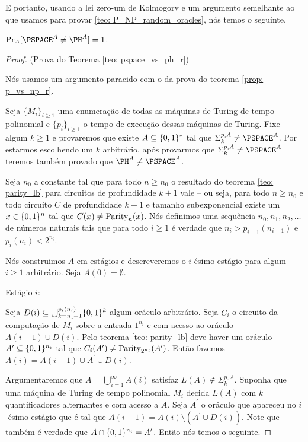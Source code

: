 E portanto, usando a lei zero-um de Kolmogorv e um argumento semelhante ao que usamos para provar \ref{teo: P_NP_random_oracles}, nós temos o seguinte.

\begin{teo} \label{teo: pspace_vs_ph_random}

$\Pr_{A}[\PSPACE^{A} \neq \PH^{A}] = 1$.

\end{teo}

\begin{proof} (Prova do Teorema \ref{teo: pspace_vs_ph_r})

Nós usamos um argumento paracido com o da prova do teorema \ref{prop: p_vs_np_r}.

Seja $\{M_{i}\}_{i \geq 1}$ uma enumeração de todas as máquinas de Turing de tempo polinomial e $\{p_{i}\}_{i \geq 1}$ o tempo de execução dessas máquinas de Turing. Fixe algum $k \geq 1$ e provaremos que existe $A \subseteq \{0, 1\}^{*}$ tal que $\Sigma_{k}^{p, A} \neq \PSPACE^{A}$. Por estarmos escolhendo um $k$ arbitrário, após provarmos que $\Sigma_{k}^{p, A} \neq \PSPACE^{A}$ teremos também provado que $\PH^{A} \neq \PSPACE^{A}$.

Seja $n_{0}$ a constante tal que para todo $n \geq n_{0}$ o resultado do teorema \ref{teo: parity_lb} para circuitos de profundidade $k + 1$ vale -- ou seja, para todo $n \geq n_{0}$ e todo circuito $C$ de profundidade $k + 1$ e tamanho subexponencial existe um $x \in \{0, 1\}^{n}$ tal que $C(x) \neq \text{Parity}_{n}(x)$. Nós definimos uma sequência $n_{0}, n_{1}, n_{2}, \dots$ de números naturais tais que para todo $i \geq 1$ é verdade que $n_{i} > p_{i - 1}(n_{i - 1})$ e $p_{i}(n_{i}) < 2^{n_{i}}$.

Nós construimos $A$ em estágios e descreveremos o $i$-ésimo estágio para algum $i \geq 1$ arbitrário. Seja $A(0) = \emptyset$.

Estágio $i$:

Seja $D(i) \subseteq \bigcup_{k = n_{i} + 1}^{p_{i}(n_{i})} \{0, 1\}^{k}$ algum oráculo arbitrário. Seja $C_{i}$ o circuito da computação de $M_{i}$ sobre a entrada $1^{n_{i}}$ e com acesso ao oráculo $A(i - 1) \cup D(i)$. Pelo teorema \ref{teo: parity_lb} deve haver um oráculo $A^{\prime} \subseteq \{0, 1\}^{n_{i}}$ tal que $C_{i}(A^{\prime}) \neq \text{Parity}_{2^{n_{i}}}(A^{\prime})$. Então fazemos $A(i) = A(i - 1) \cup A^{\prime} \cup D(i)$.

Argumentaremos que $A = \bigcup_{i = 1}^{\infty}A(i)$ satisfaz $L(A) \not\in \Sigma_{k}^{p, A}$. Suponha que uma máquina de Turing de tempo polinomial $M_{i}$ decida $L(A)$ com $k$ quantificadores alternantes e com acesso a $A$. Seja $A^{\prime}$ o oráculo que apareceu no $i$-ésimo estágio que é tal que $A(i - 1) = A(i) \setminus (A^{\prime} \cup D(i))$. Note que também é verdade que $A \cap \{0, 1\}^{n_{i}} = A^{\prime}$. Então nós temos o seguinte.


\end{proof}
